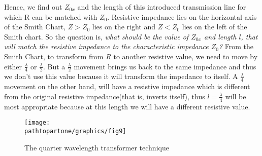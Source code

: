Hence, we find out $ Z_{0x}$ and the length of this introduced transmission line for which R can be matched with $ Z_0$. Resistive impedance lies on the horizontal axis of the Smith Chart, $Z > Z_0$ lies on the right and $Z < Z_0$ lies on the left of the Smith chart. So the question is, \emph{what should be the value of $Z_{0x}$ and length $l$, that will match the resistive impedance to the characteristic impedance $Z_0$?} From the Smith Chart, to transform from $R$ to another resistive value, we need to move by either $ \frac{\lambda}{4}$ or $ \frac{\lambda}{2}$. But a $\frac{\lambda}{2}$ movement brings us back to the same impedance and thus we don't use this value because it will transform the impedance to itself. A $\frac{\lambda}{4}$ movement on the other hand, will have a resistive impedance which is different from the original resistive impedance(that is, inverts itself), thus $l = \frac{\lambda}{4} $ will be most appropriate because at this length we will have a different resistive value.
\begin{figure}[h]
\centering
\texttt{[image: \\pathtopartone/graphics/fig9]}
\caption{The quarter wavelength transformer technique}
\label{fig:fig9}
\end{figure}

